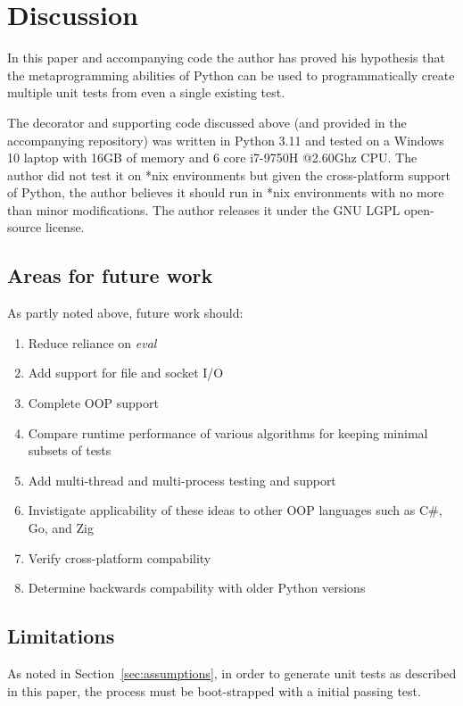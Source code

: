 \section{Discussion}\label{sec:discussion}

In this paper and accompanying code the author
has proved his hypothesis that the metaprogramming abilities of 
Python can be used to programmatically create multiple 
unit tests from even a single existing test.

The decorator and supporting code discussed above
(and provided in the accompanying repository)
was written in Python 3.11 and tested on a 
Windows 10 laptop with 16GB of memory and 6 core i7-9750H @2.60Ghz CPU.
The author did not test it on *nix environments but given the
cross-platform support of Python, the author believes it should run in *nix 
environments with no more than minor modifications. The author releases it
under the GNU LGPL open-source license.

\subsection{Areas for future work}\label{sec:tuning-2}
As partly noted above, future work should: 
\begin{enumerate}
  \item Reduce reliance on \textit{eval}
  \item Add support for file and socket I/O
  \item Complete OOP support
  \item Compare runtime performance of various algorithms for keeping minimal subsets of tests
  \item Add multi-thread and multi-process testing and support
  \item Invistigate applicability of these ideas to other OOP languages such as C\#, Go, and Zig
  \item Verify cross-platform compability
  \item Determine backwards compability with older Python versions
\end{enumerate}

\subsection{Limitations}\label{sec:limitations}
As noted in Section~\ref{sec:assumptions}, in order to 
generate unit tests as described in this paper, the 
process must be boot-strapped with a initial passing test.

